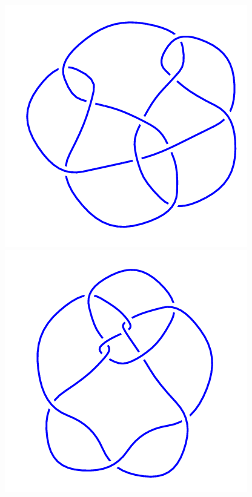 \begin{figure}[H]
\begin{minipage}[b]{.18\linewidth}
    \end{minipage}
    \begin{minipage}[b]{.18\linewidth}
        \centering
        \includegraphics[width=\linewidth]{../data/10_89.png}
    \end{minipage}
    \begin{minipage}[b]{.18\linewidth}
        \centering
        \includegraphics[width=\linewidth]{../data/10_90.png}

\end{minipage}
\end{figure}
